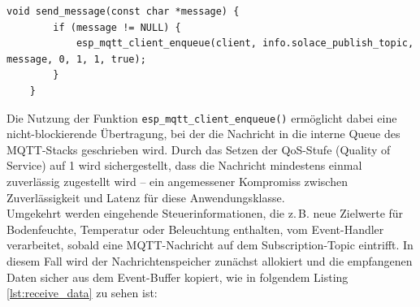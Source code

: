 \begin{lstlisting}[style=cstyle, caption={Senden der Sensordaten}, label={lst:send_data}]
	void send_message(const char *message) {
		if (message != NULL) {
			esp_mqtt_client_enqueue(client, info.solace_publish_topic, message, 0, 1, 1, true);
		}
	}
\end{lstlisting}
\vspace{1em}
\noindent Die Nutzung der Funktion \texttt{esp\_mqtt\_client\_enqueue()} ermöglicht dabei eine nicht-blockierende Übertragung, bei der die Nachricht in die interne Queue des MQTT-Stacks geschrieben wird. Durch das Setzen der QoS-Stufe (Quality of Service) auf 1 wird sichergestellt, dass die Nachricht mindestens einmal zuverlässig zugestellt wird – ein angemessener Kompromiss zwischen Zuverlässigkeit und Latenz für diese Anwendungsklasse.
\\
Umgekehrt werden eingehende Steuerinformationen, die z.\,B. neue Zielwerte für Bodenfeuchte, Temperatur oder Beleuchtung enthalten, vom Event-Handler verarbeitet, sobald eine MQTT-Nachricht auf dem Subscription-Topic eintrifft. In diesem Fall wird der Nachrichtenspeicher zunächst allokiert und die empfangenen Daten sicher aus dem Event-Buffer kopiert, wie in folgendem Listing \vref{lst:receive_data} zu sehen ist:
\\

